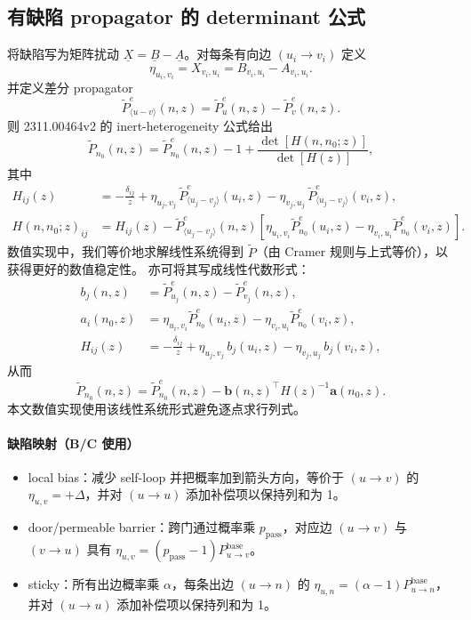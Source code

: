 \documentclass[11pt,fontset=fandol]{ctexart}
\begin{document}
\subsection{有缺陷 propagator 的 determinant 公式}
将缺陷写为矩阵扰动 $\underline{X}=\underline{B}-\underline{A}$。对每条有向边 $(u_i\to v_i)$ 定义
\begin{equation}
  \eta_{u_i,v_i}=X_{v_i,u_i}=B_{v_i,u_i}-A_{v_i,u_i}.
\end{equation}
并定义差分 propagator
\begin{equation}
  \tilde P^e_{\langle u-v\rangle}(n,z)=\tilde P^e_{u}(n,z)-\tilde P^e_{v}(n,z).
\end{equation}
则 2311.00464v2 的 inert-heterogeneity 公式给出
\begin{equation}
  \tilde P_{n_0}(n,z)=\tilde P^e_{n_0}(n,z)-1+\frac{\det[H(n,n_0;z)]}{\det[H(z)]},
\end{equation}
其中
\begin{align}
  H_{ij}(z)&=-\frac{\delta_{ij}}{z}+\eta_{u_j,v_j}\,\tilde P^e_{\langle u_j-v_j\rangle}(u_i,z)-\eta_{v_j,u_j}\,\tilde P^e_{\langle u_j-v_j\rangle}(v_i,z),\\
  H(n,n_0;z)_{ij}&=H_{ij}(z)-\tilde P^e_{\langle u_j-v_j\rangle}(n,z)\left[\eta_{u_i,v_i}\tilde P^e_{n_0}(u_i,z)-\eta_{v_i,u_i}\tilde P^e_{n_0}(v_i,z)\right].
\end{align}
数值实现中，我们等价地求解线性系统得到 $\tilde P$（由 Cramer 规则与上式等价），以获得更好的数值稳定性。
亦可将其写成线性代数形式：
\begin{align}
  b_j(n,z)&=\tilde P^e_{u_j}(n,z)-\tilde P^e_{v_j}(n,z),\\
  a_i(n_0,z)&=\eta_{u_i,v_i}\tilde P^e_{n_0}(u_i,z)-\eta_{v_i,u_i}\tilde P^e_{n_0}(v_i,z),\\
  H_{ij}(z)&=-\frac{\delta_{ij}}{z}+\eta_{u_j,v_j}\,b_j(u_i,z)-\eta_{v_j,u_j}\,b_j(v_i,z),
\end{align}
从而
\begin{equation}
  \tilde P_{n_0}(n,z)=\tilde P^e_{n_0}(n,z)-\mathbf{b}(n,z)^\top H(z)^{-1}\mathbf{a}(n_0,z).
\end{equation}
本文数值实现使用该线性系统形式避免逐点求行列式。

\paragraph{缺陷映射（B/C 使用）}
\begin{itemize}
  \item local bias：减少 self-loop 并把概率加到箭头方向，等价于 $(u\to v)$ 的 $\eta_{u,v}=+\Delta$，并对 $(u\to u)$ 添加补偿项以保持列和为 1。
  \item door/permeable barrier：跨门通过概率乘 $p_{\text{pass}}$，对应边 $(u\to v)$ 与 $(v\to u)$ 具有 $\eta_{u,v}=(p_{\text{pass}}-1)P_{u\to v}^{\text{base}}$。
  \item sticky：所有出边概率乘 $\alpha$，每条出边 $(u\to n)$ 的 $\eta_{u,n}=(\alpha-1)P_{u\to n}^{\text{base}}$，并对 $(u\to u)$ 添加补偿项以保持列和为 1。
\end{itemize}
\end{document}
